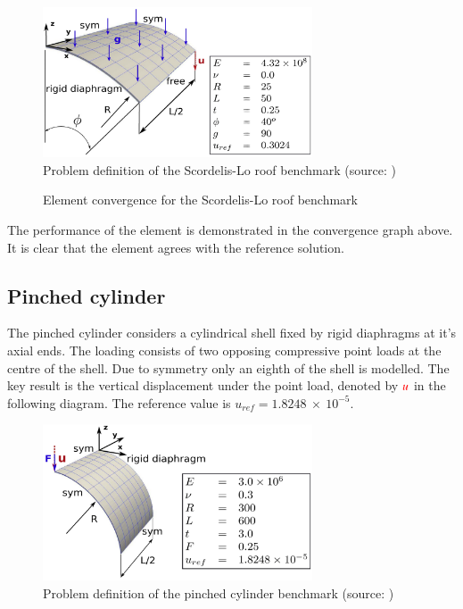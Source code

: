 \begin{figure}[H]
	\centering
	\def\svgwidth{\columnwidth}
	\includegraphics[width=8cm]{images/scordelisroof.png}
	\caption{Problem definition of the Scordelis-Lo roof benchmark (source: \cite{Bou13})}
	\label{scordelisroof}
\end{figure}

\pgfplotsset{width=6cm}
\begin{figure}[H]
	\centering
	\caption{Element convergence for the Scordelis-Lo roof benchmark}
	\label{scordelisroofbench}
\end{figure}



The performance of the element is demonstrated in the convergence graph above. It is clear that the element agrees with the reference solution.

\subsection{Pinched cylinder}

The pinched cylinder considers a cylindrical shell fixed by rigid diaphragms at it's axial ends. The loading consists of two opposing compressive point loads at the centre of the shell. Due to symmetry only an eighth of the shell is modelled. The key result is the vertical displacement under the point load, denoted by $\textcolor{red}{u}$ in the following diagram. The reference value is $u_{ref} =  1.8248\ \times\ 10^{-5}$. 

\begin{figure}[H]
	\centering
	\def\svgwidth{\columnwidth}
	\includegraphics[width=8cm]{images/pinchedcylinder.png}
	\caption{Problem definition of the pinched cylinder benchmark (source: \cite{Bou13})}
	\label{pinchedcylinder}
\end{figure}


